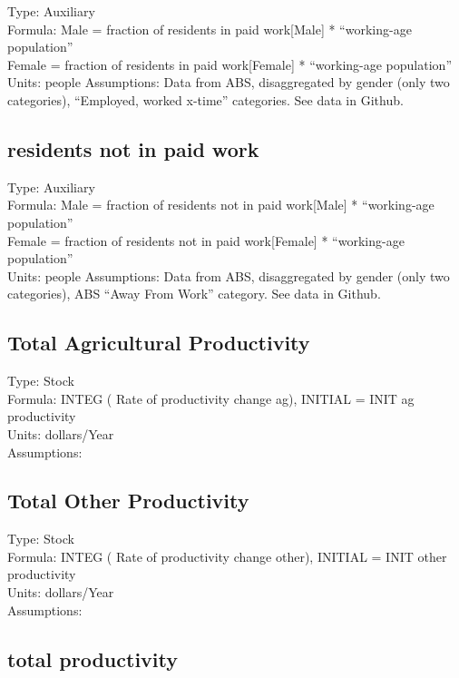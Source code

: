 \documentclass[
  11pt,
]{book}
\begin{document}
Type: Auxiliary\\
Formula: Male = fraction of residents in paid work{[}Male{]} * ``working-age population''\\
Female = fraction of residents in paid work{[}Female{]} * ``working-age population''\\
Units: people
Assumptions: Data from ABS, disaggregated by gender (only two categories), ``Employed, worked x-time'' categories. See data in Github.

\hypertarget{residents-not-in-paid-work}{%
\subsection{residents not in paid work}\label{residents-not-in-paid-work}}

Type: Auxiliary\\
Formula: Male = fraction of residents not in paid work{[}Male{]} * ``working-age population''\\
Female = fraction of residents not in paid work{[}Female{]} * ``working-age population''\\
Units: people
Assumptions: Data from ABS, disaggregated by gender (only two categories), ABS ``Away From Work'' category. See data in Github.

\hypertarget{total-agricultural-productivity}{%
\subsection{Total Agricultural Productivity}\label{total-agricultural-productivity}}

Type: Stock\\
Formula: INTEG ( Rate of productivity change ag), INITIAL = INIT ag productivity\\
Units: dollars/Year\\
Assumptions:

\hypertarget{total-other-productivity}{%
\subsection{Total Other Productivity}\label{total-other-productivity}}

Type: Stock\\
Formula: INTEG ( Rate of productivity change other), INITIAL = INIT other productivity\\
Units: dollars/Year\\
Assumptions:

\hypertarget{total-productivity}{%
\subsection{total productivity}\label{total-productivity}}
\end{document}
